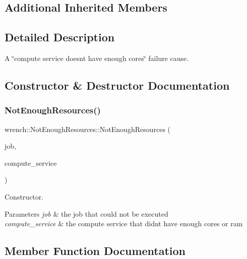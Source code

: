 \subsection*{Additional Inherited Members}


\subsection{Detailed Description}
A \char`\"{}compute service doesn\textquotesingle{}t have enough cores\char`\"{} failure cause. 

\subsection{Constructor \& Destructor Documentation}
\mbox{\label{classwrench_1_1_not_enough_resources_a3ed2fb3a0726d4072ffed8c91521fda4}} 
\subsubsection{\texorpdfstring{Not\+Enough\+Resources()}{NotEnoughResources()}}
{\footnotesize\ttfamily wrench\+::\+Not\+Enough\+Resources\+::\+Not\+Enough\+Resources (\begin{DoxyParamCaption}\item[{\hyperlink{classwrench_1_1_workflow_job}{Workflow\+Job} $\ast$}]{job,  }\item[{\hyperlink{classwrench_1_1_compute_service}{Compute\+Service} $\ast$}]{compute\+\_\+service }\end{DoxyParamCaption})}



Constructor. 


\begin{DoxyParams}{Parameters}
{\em job} & the job that could not be executed \\
\hline
{\em compute\+\_\+service} & the compute service that didn\textquotesingle{}t have enough cores or ram \\
\hline
\end{DoxyParams}


\subsection{Member Function Documentation}
\mbox{\label{classwrench_1_1_not_enough_resources_a2ded283721b584804b1220b2db4548b3}} 
